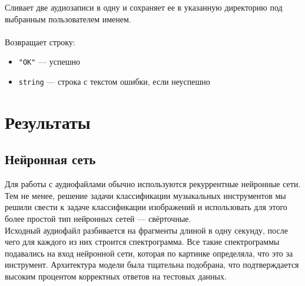 \documentclass[14pt,a4paper]{article}
\begin{document}
\noindent Сливает две аудиозаписи в одну и сохраняет ее в указанную директорию под выбранным пользователем именем. \\\\
Возвращает строку:
\smallskip
\begin{itemize}
\item \lstinline{"OK"} --- успешно
\item \lstinline{string} --- строка с текстом ошибки, если неуспешно
\end{itemize}

\newpage

\section[Результаты]{\huge Результаты}

\subsection{Нейронная сеть}

Для работы с аудиофайлами обычно используются рекуррентные нейронные сети. Тем не менее, решение задачи классификации музыкальных инструментов мы решили свести к задаче классификации изображений и использовать для этого более простой тип нейронных сетей — свёрточные. \\

Исходный аудиофайл разбивается на фрагменты длиной в одну секунду, после чего для каждого из них строится спектрограмма. Все такие спектрограммы подавались на вход нейронной сети, которая по картинке определяла, что это за инструмент. Архитектура модели была тщательна подобрана, что подтверждается высоким процентом корректных ответов на тестовых данных.


\end{document}
